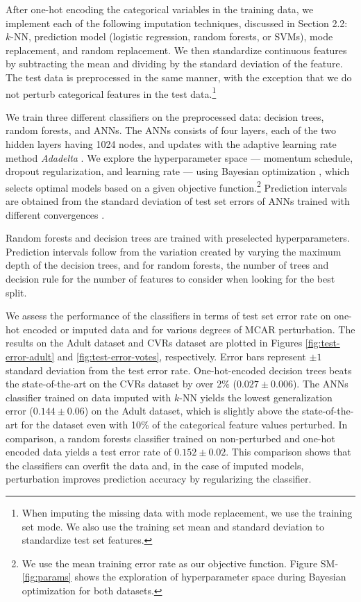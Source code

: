 \documentclass[10pt]{book}
\theoremstyle{definition}
\begin{document}
After one-hot encoding the categorical variables in the training data, we implement each of the following imputation techniques, discussed in Section 2.2: $k$-NN, prediction model (logistic regression, random forests, or SVMs), mode replacement, and random replacement. We then standardize continuous features by subtracting the mean and dividing by the standard deviation of the feature. The test data is preprocessed in the same manner, with the exception that we do not perturb categorical features in the test data.\footnote{When imputing the missing data with mode replacement, we use the training set mode. We also use the training set mean and standard deviation to standardize test set features.\nocite{rubin1995}}

\par
{}

We train three different classifiers on the preprocessed data: decision trees, random forests, and ANNs. The ANNs consists of four layers, each of the two hidden layers having 1024 nodes, and updates with the adaptive learning rate method \emph{Adadelta} \citep{zeiler2012}. We explore the hyperparameter space ---  momentum schedule, dropout regularization, and learning rate --- using Bayesian optimization \citep{snoek2012}, which selects optimal models based on a given objective function.\footnote{We use the mean training error rate as our objective function. Figure SM-\ref{fig:params} shows the exploration of hyperparameter space during Bayesian optimization for both datasets.} Prediction intervals are obtained from the standard deviation of test set errors of ANNs trained with different convergences \citep{heskes1997}. 

Random forests and decision trees are trained with preselected hyperparameters. Prediction intervals follow from the variation created by varying the maximum depth of the decision trees, and for random forests, the number of trees and decision rule for the number of features to consider when looking for the best split. 

\par
{}

We assess the performance of the classifiers in terms of test set error rate on one-hot encoded or imputed data and for various degrees of MCAR perturbation. The results on the Adult dataset and CVRs dataset are plotted in Figures \ref{fig:test-error-adult} and \ref{fig:test-error-votes}, respectively. Error bars represent $\pm 1$ standard deviation from the test error rate. One-hot-encoded decision trees beats the state-of-the-art on the CVRs dataset by over 2\% ($0.027 \pm 0.006$). The ANNs classifier trained on data imputed with $k$-NN yields the lowest generalization error ($0.144 \pm 0.06$) on the Adult dataset, which is slightly above the state-of-the-art for the dataset even with 10\% of the categorical feature values perturbed. In comparison, a random forests classifier trained on non-perturbed and one-hot encoded data yields a test error rate of $0.152 \pm 0.02$. This comparison shows that the classifiers can overfit the data and, in the case of imputed models, perturbation improves prediction accuracy by regularizing the classifier. 
\end{document}
